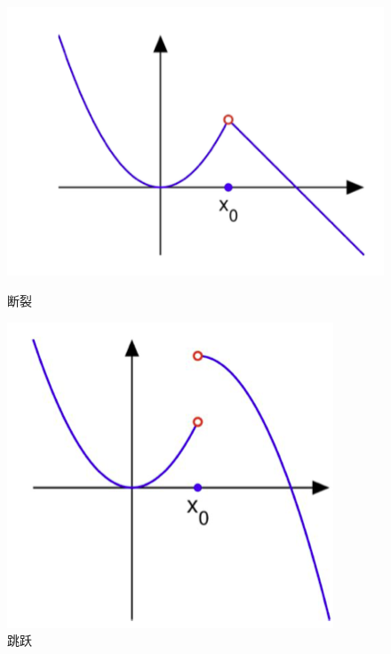 \begin{figure}[ht]
  \centering
  \begin{minipage}[h]{0.4\textwidth}
    \includegraphics[width=\textwidth]{asset/aa29dda5-78fc-480a-b2ac-f1692445d496.png}
    \caption{断裂}
    \label{fig:img9_1}
  \end{minipage}%
  \hspace{2em}
  \begin{minipage}[h]{0.3\textwidth}
    \includegraphics[width=\textwidth]{asset/63c70c64-4dda-41c6-94b5-9f88083516d0.png}
    \caption{跳跃}
    \label{fig:img9_2}
  \end{minipage}
\end{figure}

